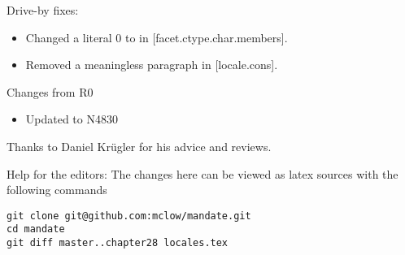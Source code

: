 Drive-by fixes:
\begin{itemize}
\item{Changed a literal 0 to  in [facet.ctype.char.members].}
\item{Removed a meaningless paragraph in [locale.cons].}
\end{itemize}

Changes from R0
\begin{itemize}
\item{Updated to N4830}
\end{itemize}



Thanks to Daniel Krügler for his advice and reviews.

\vfill
Help for the editors: The changes here can be viewed as latex sources with the following commands
\begin{verbatim}
git clone git@github.com:mclow/mandate.git
cd mandate
git diff master..chapter28 locales.tex
\end{verbatim}

